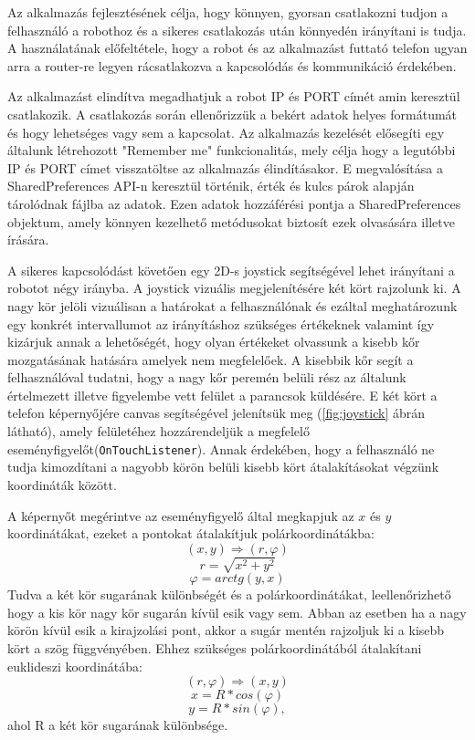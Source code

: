 Az alkalmazás fejlesztésének célja, hogy könnyen, gyorsan csatlakozni tudjon a felhasználó a robothoz és a sikeres csatlakozás után könnyedén irányítani is tudja. A használatának előfeltétele, hogy a robot és az alkalmazást futtató telefon ugyan arra a router-re legyen rácsatlakozva a kapcsolódás és kommunikáció érdekében. 

Az alkalmazást elindítva megadhatjuk a robot IP és PORT címét amin keresztül csatlakozik. A csatlakozás során ellenőrizzük a bekért adatok helyes formátumát és hogy lehetséges vagy sem a kapcsolat. Az alkalmazás kezelését elősegíti egy általunk létrehozott "Remember me" funkcionalitás, mely célja hogy a legutóbbi IP és PORT címet visszatöltse az alkalmazás élindításakor. E megvalósítása a SharedPreferences API-n keresztül történik, érték és kulcs párok alapján tárolódnak fájlba az adatok. Ezen adatok hozzáférési pontja a SharedPreferences objektum, amely könnyen kezelhető metódusokat biztosít ezek olvasására illetve írására.

A sikeres kapcsolódást követően egy 2D-s joystick segítségével lehet irányítani a robotot négy irányba. A joystick vizuális megjelenítésére két kört rajzolunk ki. A nagy kör jelöli vizuálisan a határokat a felhasználónak és ezáltal meghatározunk egy konkrét intervallumot az irányításhoz szükséges értékeknek valamint így kizárjuk annak a lehetőségét, hogy olyan értékeket olvassunk a kisebb kőr mozgatásának hatására amelyek nem megfelelőek. A kisebbik kőr segít a felhasználóval tudatni, hogy a nagy kőr peremén belüli rész az általunk értelmezett illetve figyelembe vett felület a parancsok küldésére. E két kört a telefon képernyőjére canvas segítségével jelenítsük meg (\ref{fig:joystick} ábrán látható), amely felületéhez hozzárendeljük a megfelelő eseményfigyelőt(\texttt{OnTouchListener}). Annak érdekében, hogy a felhasználó ne tudja kimozdítani a nagyobb körön belüli kisebb kört átalakításokat végzünk koordináták között.

A képernyőt megérintve az eseményfigyelő által megkapjuk az $x$ és $y$ koordinátákat, ezeket a pontokat átalakítjuk polárkoordinátákba: $$(x,y) \Longrightarrow (r,\varphi)$$ $$r=\sqrt{x^2+y^2}$$ $$\varphi=arctg(y,x)$$ Tudva a két kör sugarának különbségét és a polárkoordinátákat, leellenőrizhető hogy a kis kör nagy kör sugarán kívül esik vagy sem. Abban az esetben ha a nagy körön kívül esik a kirajzolási pont, akkor a sugár mentén rajzoljuk ki a kisebb kört a szög függvényében. Ehhez szükséges polárkoordinátából átalakítani euklideszi koordinátába:  $$(r,\varphi) \Longrightarrow (x,y)$$ $$x=R*cos(\varphi)$$ $$y=R*sin(\varphi),$$ ahol R a két kör sugarának különbsége.

